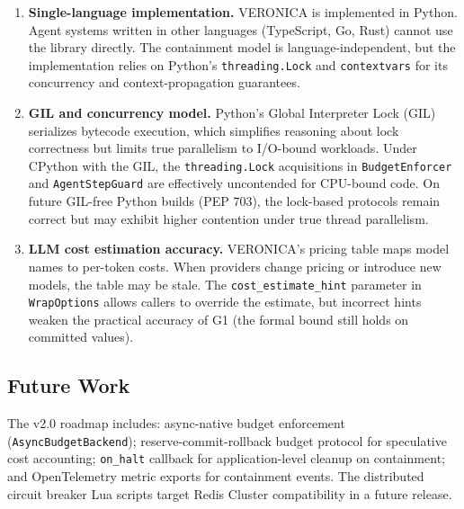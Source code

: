 \documentclass[11pt]{article}
\begin{document}
\begin{enumerate}
    This bound is tight: it is achievable when all $N$ threads pass the budget
    check simultaneously, each dispatches one call, and all $N$ calls succeed
    and commit cost before any observes the updated accumulator. The two-phase
    reserve/commit protocol (v2.0 roadmap) would reduce the residual to the
    cost of the single reserving call, at the expense of additional lock
    contention.

  \item \textbf{Single-language implementation.} VERONICA is implemented in
    Python. Agent systems written in other languages (TypeScript, Go, Rust)
    cannot use the library directly. The containment model is
    language-independent, but the implementation relies on Python's
    \texttt{threading.Lock} and \texttt{contextvars} for its concurrency and
    context-propagation guarantees.

  \item \textbf{GIL and concurrency model.} Python's Global Interpreter Lock
    (GIL) serializes bytecode execution, which simplifies reasoning about lock
    correctness but limits true parallelism to I/O-bound workloads. Under
    CPython with the GIL, the \texttt{threading.Lock} acquisitions in
    \texttt{BudgetEnforcer} and \texttt{AgentStepGuard} are effectively
    uncontended for CPU-bound code. On future GIL-free Python builds (PEP
    703), the lock-based protocols remain correct but may exhibit higher
    contention under true thread parallelism.

  \item \textbf{LLM cost estimation accuracy.} VERONICA's pricing table maps
    model names to per-token costs. When providers change pricing or introduce
    new models, the table may be stale. The \texttt{cost\_estimate\_hint}
    parameter in \texttt{WrapOptions} allows callers to override the estimate,
    but incorrect hints weaken the practical accuracy of G1 (the formal bound
    still holds on committed values).
\end{enumerate}

\subsection{Future Work}

The v2.0 roadmap includes: async-native budget enforcement
(\texttt{AsyncBudgetBackend}); reserve-commit-rollback budget protocol for
speculative cost accounting; \texttt{on\_halt} callback for
application-level cleanup on containment; and OpenTelemetry metric exports
for containment events. The distributed circuit breaker Lua scripts target
Redis Cluster compatibility in a future release.
\end{document}
